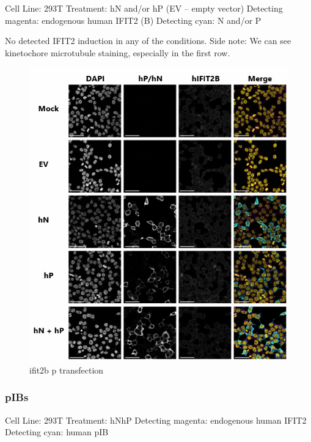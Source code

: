 Cell Line: 293T \newline
Treatment: hN and/or hP (EV – empty vector) \newline
Detecting magenta: endogenous human IFIT2 (B) \newline
Detecting cyan: N and/or P \newline

No detected IFIT2 induction in any of the conditions.
Side note: We can see kinetochore microtubule staining, especially in the first row.

\begin{figure}
    \centering
    \includegraphics[width=1\linewidth]{10. Chapter 5/Figs/02. pIB/02. ifit2b p transfection.png}
    \caption[ifit2b p transfection]{ifit2b p transfection}
    \label{fig:ifit2b p transfection}
\end{figure}

\subsubsection{pIBs}
Cell Line: 293T \newline
Treatment: hNhP \newline
Detecting magenta: endogenous human IFIT2 \newline
Detecting cyan: human pIB \newline

